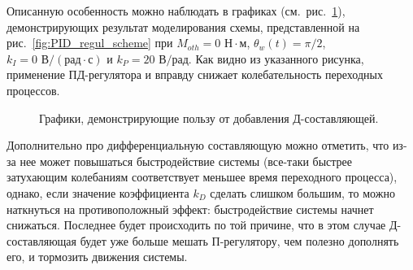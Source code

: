 \documentclass[12pt,a4paper,openany]{extarticle}
\begin{document}
Описанную особенность можно наблюдать в графиках (см.~рис.~\ref{fig:PD_regul_advantages}), демонстрирующих результат моделирования схемы, представленной на рис.~\ref{fig:PID_regul_scheme} при $M_{oth}=0\text{ Н}{\cdot}\text{м}$, $\theta_w(t) = \pi/2$, $k_I = 0\text{ В}/(\text{рад}{\cdot}\text{с})$ и $k_P = 20\text{ В/рад}$.
Как видно из указанного рисунка, применение ПД-регулятора и вправду снижает колебательность переходных процессов. 

\begin{figure}[h!]
	\vspace{-0.5cm}
	\caption{Графики, демонстрирующие пользу от добавления Д-составляющей.}
	\label{fig:PD_regul_advantages}
\end{figure}	

Дополнительно про дифференциальную составляющую можно отметить, что из-за нее может повышаться быстродействие системы (все-таки быстрее затухающим колебаниям соответствует меньшее время переходного процесса), однако, если значение коэффициента $k_D$ сделать слишком большим, то можно наткнуться на противоположный эффект: быстродействие системы начнет снижаться.
Последнее будет происходить по той причине, что в этом случае Д-составляющая будет уже больше мешать П-регулятору, чем полезно дополнять его, и тормозить движения системы.
\end{document}
